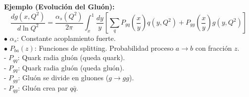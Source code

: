 \textbf{Ejemplo (Evolución del Gluón):}
$$ \frac{d g(x,Q^2)}{d \ln Q^2} = \frac{\alpha_s(Q^2)}{2\pi} \int_x^1 \frac{dy}{y} \left[ \sum_q P_{gq}\left(\frac{x}{y}\right) q(y,Q^2) + P_{gg}\left(\frac{x}{y}\right) g(y,Q^2) \right] $$
$\bullet$ $\alpha_s$: Constante acoplamiento fuerte. \\
$\bullet$ $P_{ba}(z)$: Funciones de splitting. Probabilidad proceso $a \to b$ con fracción $z$.\\
- $P_{qq}$: Quark radia gluón (queda quark).\\
- $P_{gq}$: Quark radia gluón (queda gluón).\\
- $P_{gg}$: Gluón se divide en gluones ($g \to gg$).\\
- $P_{qg}$: Gluón crea par $q\bar{q}$.\\


